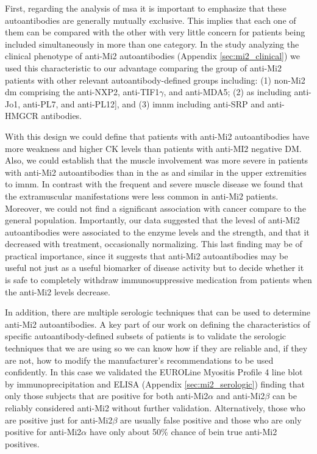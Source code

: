 First, regarding the analysis of \gls{msa} it is important to emphasize that these autoantibodies are generally mutually exclusive. This implies that each one of them can be compared with the other with very little concern for patients being included simultaneously in more than one category. In the study analyzing the clinical phenotype of anti-Mi2 autoantibodies (Appendix \autoref{sec:mi2_clinical}) we used this characteristic to our advantage comparing the group of anti-Mi2 patients with other relevant autoantibody-defined groups including: (1) non-Mi2 \gls{dm} comprising the anti-NXP2, anti-TIF1$\gamma$, and anti-MDA5; (2) \gls{as} including anti-Jo1, anti-PL7, and anti-PL12], and (3) \gls{imnm} including anti-SRP and anti-HMGCR antibodies.

With this design we could define that patients with anti-Mi2 autoantibodies have more weakness and higher CK levels than patients with anti-MI2 negative DM. Also, we could establish that the muscle involvement was more severe in patients with anti-Mi2 autoantibodies than in the \gls{as} and similar in the upper extremities to \gls{imnm}. In contrast with the frequent and severe muscle disease we found that the extramuscular manifestations were less common in anti-Mi2 patients. Moreover, we could not find a significant association with cancer compare to the general population. Importantly, our data suggested that the levesl of anti-Mi2 autoantibodies were associated to the enzyme levels and the strength, and that it decreased with treatment, occasionally normalizing. This last finding may be of practical importance, since it suggests that anti-Mi2 autoantibodies may be useful not just as a useful biomarker of disease activity but to decide whether it is safe to completely withdraw immunosuppressive medication from patients when the anti-Mi2 levels decrease.

In addition, there are multiple serologic techniques that can be used to determine anti-Mi2 autoantibodies. A key part of our work on defining the characteristics of specific autoantibody-defined subsets of patients is to validate the serologic techniques that we are using so we can know how if they are reliable and, if they are not, how to modify the manufacturer's recommendations to be used confidently. In this case we validated the EUROLine Myositis Profile 4 line blot by immunoprecipitation and ELISA (Appendix \autoref{sec:mi2_serologic}) finding that only those subjects that are positive for both anti-Mi2$\alpha$ and anti-Mi2$\beta$ can be reliably considered anti-Mi2 without further validation. Alternatively, those who are positive just for anti-Mi2$\beta$ are usually false positive and those who are only positive for anti-Mi2$\alpha$ have only about 50\% chance of bein true anti-Mi2 positives.

